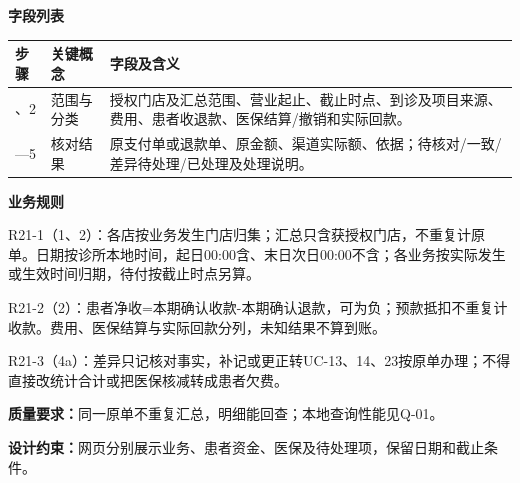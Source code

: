 \documentclass[UTF8,a4paper,zihao=-4,fontset=none]{ctexart}
\begin{document}
\noindent\textbf{字段列表}\par
{\setlength{\tabcolsep}{3pt}\renewcommand{\arraystretch}{1.04}
\noindent\begin{tabular}{@{}>{\raggedright\arraybackslash}p{1.2cm}>{\raggedright\arraybackslash}p{2.2cm}>{\raggedright\arraybackslash}p{12.3cm}@{}}
\toprule
步骤 & 关键概念 & 字段及含义 \\ \midrule
1、2 & 范围与分类 & 授权门店及汇总范围、营业起止、截止时点、到诊及项目来源、费用、患者收退款、医保结算/撤销和实际回款。 \\
3—5 & 核对结果 & 原支付单或退款单、原金额、渠道实际额、依据；待核对/一致/差异待处理/已处理及处理说明。 \\
\bottomrule
\end{tabular}\par}
\smallskip
\noindent\textbf{业务规则}\par
\noindent R21-1（1、2）：各店按业务发生门店归集；汇总只含获授权门店，不重复计原单。日期按诊所本地时间，起日00:00含、末日次日00:00不含；各业务按实际发生或生效时间归期，待付按截止时点另算。\par
\noindent R21-2（2）：患者净收=本期确认收款-本期确认退款，可为负；预款抵扣不重复计收款。费用、医保结算与实际回款分列，未知结果不算到账。\par
\noindent R21-3（4a）：差异只记核对事实，补记或更正转UC-13、14、23按原单办理；不得直接改统计合计或把医保核减转成患者欠费。\par
\smallskip
\noindent\textbf{质量要求：}同一原单不重复汇总，明细能回查；本地查询性能见Q-01。\par
\noindent\textbf{设计约束：}网页分别展示业务、患者资金、医保及待处理项，保留日期和截止条件。\par
\endgroup
\clearpage
\end{document}
